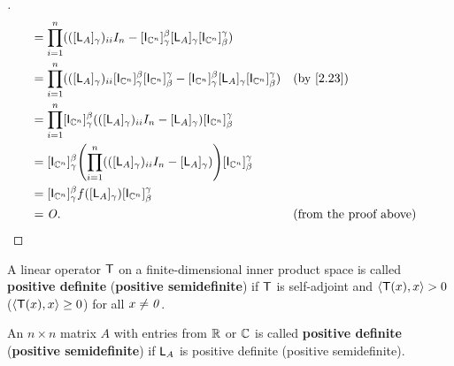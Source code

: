 \begin{proof}[]
\begin{align*}
         & = \prod_{i = 1}^n (([\L_A]_{\gamma})_{i i} I_n - [\IT[\C^n]]_{\gamma}^{\beta} [\L_A]_{\gamma} [\IT[\C^n]]_{\beta}^{\gamma})                                                                                          \\
         & = \prod_{i = 1}^n (([\L_A]_{\gamma})_{i i} [\IT[\C^n]]_{\gamma}^{\beta} [\IT[\C^n]]_{\beta}^{\gamma} - [\IT[\C^n]]_{\gamma}^{\beta} [\L_A]_{\gamma} [\IT[\C^n]]_{\beta}^{\gamma}) &  & \by{2.23}                     \\
         & = \prod_{i = 1}^n [\IT[\C^n]]_{\gamma}^{\beta} (([\L_A]_{\gamma})_{i i} I_n - [\L_A]_{\gamma}) [\IT[\C^n]]_{\beta}^{\gamma}                                                                                          \\
         & = [\IT[\C^n]]_{\gamma}^{\beta} \pa{\prod_{i = 1}^n (([\L_A]_{\gamma})_{i i} I_n - [\L_A]_{\gamma})} [\IT[\C^n]]_{\beta}^{\gamma}                                                                                     \\
         & = [\IT[\C^n]]_{\gamma}^{\beta} f([\L_A]_{\gamma}) [\IT[\C^n]]_{\beta}^{\gamma}                                                                                                                                       \\
         & = \zm.                                                                                                                                                                            &  & \text{(from the proof above)}
  \end{align*}
\end{proof}

\begin{defn}\label{6.4.11}
  A linear operator \(\mathsf{T}\) on a finite-dimensional inner product space is called \textbf{positive definite} (\textbf{positive semidefinite}) if \(\mathsf{T}\) is self-adjoint and \(\left\langle\mathsf{T}(x), x\right\rangle > 0\) (\(\left\langle\mathsf{T}(x), x\right\rangle \geq 0\)) for all \(x \neq \mathit{0}\).

  An \(n \times n\) matrix \(A\) with entries from \(\mathbb{R}\) or \(\mathbb{C}\) is called \textbf{positive definite} (\textbf{positive semidefinite}) if \(\mathsf{L}_A\) is positive definite (positive semidefinite).
\end{defn}

